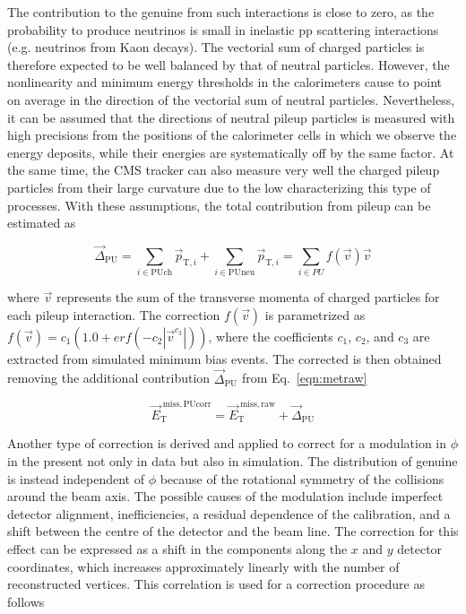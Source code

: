 The contribution to the genuine \VEtmiss from such interactions is close to zero, as the probability to produce neutrinos is small in inelastic pp scattering interactions (e.g. neutrinos from Kaon decays).
The vectorial \Vpt sum of charged particles is therefore expected to be well balanced by that of neutral particles.
However, the nonlinearity and minimum energy thresholds in the calorimeters cause \VEtmiss to point on average in the direction of the vectorial \Vpt sum of neutral particles.
Nevertheless, it can be assumed that the directions of neutral pileup particles is measured with high precisions from the positions of the calorimeter cells in which we observe the energy deposits, while their energies are systematically off by the same factor. At the same time, the CMS tracker can also measure very well the charged pileup particles from their large curvature due to the low \pt characterizing this type of processes.
With these assumptions, the total contribution from pileup can be estimated as

\begin{equation}
{\vec \Delta}_\mathrm{PU} = \sum_{i \in \mathrm{PUch}} {\vec p}_{\mathrm{T},i} + \sum_{i \in \mathrm{PUneu}} {\vec p}_{\mathrm{T},i} = \sum_{i \in PU} f({\vec v}) {\vec v}
\end{equation}

where ${\vec v}$ represents the sum of the transverse momenta of charged particles for each pileup interaction.
The correction $f({\vec v})$ is parametrized as $f({\vec v}) = c_1 (1.0 +erf(-c_2|{\vec v}^{c_3}|))$, where the coefficients $c_1$, $c_2$, and $c_3$ are extracted from simulated minimum bias events.
The corrected \VEtmiss is then obtained removing the additional contribution ${\vec \Delta}_\mathrm{PU}$ from Eq.~\ref{eqn:metraw}

\begin{equation}
{\vec E}_\mathrm{T}^\mathrm{\; miss,PUcorr} = {\vec E}_\mathrm{T}^\mathrm{\; miss,raw} + {\vec \Delta}_\mathrm{PU}
\end{equation}

Another type of correction is derived and applied to correct for a modulation in $\phi$ in the \VEtmiss present not only in data but also in simulation. The distribution of genuine \VEtmiss is instead independent of $\phi$ because of the rotational symmetry of the collisions around the beam axis. The possible causes of the modulation include imperfect detector alignment, inefficiencies, a residual \pt dependence of the calibration, and a shift between the centre of the detector and the beam line. The correction for this effect can be expressed as a shift in the \VEtmiss components along the $x$ and $y$ detector coordinates, which increases approximately linearly with the number of reconstructed vertices. This correlation is used for a correction procedure as follows

